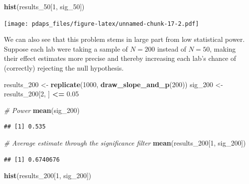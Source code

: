 \documentclass[
  12pt,
  oneside,openany]{book}
\newenvironment{Shaded}{\begin{snugshade}}{\end{snugshade}}
\newcommand{\CommentTok}[1]{\textcolor[rgb]{0.56,0.35,0.01}{\textit{#1}}}
\newcommand{\DecValTok}[1]{\textcolor[rgb]{0.00,0.00,0.81}{#1}}
\newcommand{\FloatTok}[1]{\textcolor[rgb]{0.00,0.00,0.81}{#1}}
\newcommand{\KeywordTok}[1]{\textcolor[rgb]{0.13,0.29,0.53}{\textbf{#1}}}
\newcommand{\NormalTok}[1]{#1}
\newcommand{\OperatorTok}[1]{\textcolor[rgb]{0.81,0.36,0.00}{\textbf{#1}}}
\newcommand{\StringTok}[1]{\textcolor[rgb]{0.31,0.60,0.02}{#1}}
\begin{document}
\begin{Shaded}
\begin{Highlighting}[]
\KeywordTok{hist}\NormalTok{(results\_}\DecValTok{50}\NormalTok{[}\DecValTok{1}\NormalTok{, sig\_}\DecValTok{50}\NormalTok{])}
\end{Highlighting}
\end{Shaded}

\texttt{[image: pdaps\_files/figure-latex/unnamed-chunk-17-2.pdf]}

We can also see that this problem stems in large part from low statistical power. Suppose each lab were taking a sample of \(N = 200\) instead of \(N = 50\), making their effect estimates more precise and thereby increasing each lab's chance of (correctly) rejecting the null hypothesis.

\begin{Shaded}
\begin{Highlighting}[]
\NormalTok{results\_}\DecValTok{200}\NormalTok{ \textless{}{-}}\StringTok{ }\KeywordTok{replicate}\NormalTok{(}\DecValTok{1000}\NormalTok{, }\KeywordTok{draw\_slope\_and\_p}\NormalTok{(}\DecValTok{200}\NormalTok{))}
\NormalTok{sig\_}\DecValTok{200}\NormalTok{ \textless{}{-}}\StringTok{ }\NormalTok{results\_}\DecValTok{200}\NormalTok{[}\DecValTok{2}\NormalTok{, ] }\OperatorTok{\textless{}=}\StringTok{ }\FloatTok{0.05}

\CommentTok{\# Power}
\KeywordTok{mean}\NormalTok{(sig\_}\DecValTok{200}\NormalTok{)}
\end{Highlighting}
\end{Shaded}

\begin{verbatim}
## [1] 0.535
\end{verbatim}

\begin{Shaded}
\begin{Highlighting}[]
\CommentTok{\# Average estimate through the significance filter}
\KeywordTok{mean}\NormalTok{(results\_}\DecValTok{200}\NormalTok{[}\DecValTok{1}\NormalTok{, sig\_}\DecValTok{200}\NormalTok{])}
\end{Highlighting}
\end{Shaded}

\begin{verbatim}
## [1] 0.6740676
\end{verbatim}

\begin{Shaded}
\begin{Highlighting}[]
\KeywordTok{hist}\NormalTok{(results\_}\DecValTok{200}\NormalTok{[}\DecValTok{1}\NormalTok{, sig\_}\DecValTok{200}\NormalTok{])}
\end{Highlighting}
\end{Shaded}
\end{document}
